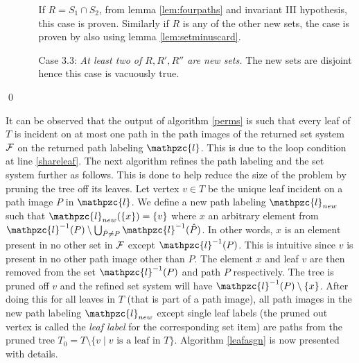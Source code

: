 \documentclass{fsttcs}
\def\cF{{\cal F}}
\def\hP{{\hat P}}
\def\cl{\mathpzc{l}}
\begin{document}
\begin{enumerate}
\begin{enumerate}
      If $R = S_1 \cap S_2$,  from lemma \ref{lem:fourpaths} and
      invariant III hypothesis,  this case is proven. Similarly if $R$
      is any of the other new  sets, the case is proven by also using
      lemma  \ref{lem:setminuscard}.
    \item [Case 3.3:] {\em At least two of $R, R', R''$ are new sets.}
      The new sets are disjoint hence this case is vacuously true.
    \end{enumerate}
  \end{enumerate} 
\qed


\noindent
It can be observed that the output of algorithm \ref{perms} is such
that every leaf of $T$ is incident on at most one path in the path
images of the returned set system $\cF$ on the returned path labeling
$\cl$. This is due to the loop condition at line \ref{shareleaf}. The
next algorithm refines the path labeling and the set system further as
follows. This is done to help reduce the size of the problem by
pruning the tree off its leaves.  Let vertex $v \in T$ be the unique
leaf incident on a path image $P$ in $\cl$.  We define a new path
labeling $\cl_{new}$ such that $\cl_{new}(\{x\}) = \{v\}$ where $x$ an
arbitrary element from $\cl^{-1}(P) \setminus \bigcup_{\hP \ne P}
\cl^{-1}(\hP)$. In other words, $x$ is an element present in no other
set in $\cF$ except $\cl^{-1}(P)$. This is intuitive since $v$ is
present in no other path image other than $P$.  The element $x$ and
leaf $v$ are then removed from the set $\cl^{-1}(P)$ and path $P$
respectively. The tree is pruned off $v$ and the refined set system
will have $\cl^{-1}(P) \setminus \{x\}$. After doing this for all
leaves in $T$ (that is part of a path image), all path images in the
new path labeling $\cl_{new}$ except single leaf labels (the pruned
out vertex is called the {\em leaf label} for the corresponding set
item) 
are paths from the pruned
tree $T_0 = T \setminus \{v \mid v \text{ is a leaf in }
T\}$. Algorithm \ref{leafasgn} is now presented with details.
\end{document}
